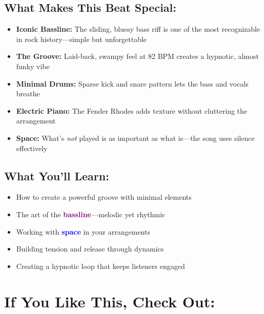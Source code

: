 \documentclass[11pt,letterpaper]{article}
\newcommand{\purple}[1]{\textcolor{purple}{\textbf{#1}}}
\newcommand{\bluepurple}[1]{\textcolor{blue}{\textbf{#1}}}
\begin{document}
\subsection*{What Makes This Beat Special:}

\begin{itemize}[leftmargin=*]
\item \textbf{Iconic Bassline:} The sliding, bluesy bass riff is one of the most recognizable in rock history—simple but unforgettable
\item \textbf{The Groove:} Laid-back, swampy feel at 82 BPM creates a hypnotic, almost funky vibe
\item \textbf{Minimal Drums:} Sparse kick and snare pattern lets the bass and vocals breathe
\item \textbf{Electric Piano:} The Fender Rhodes adds texture without cluttering the arrangement
\item \textbf{Space:} What's \textit{not} played is as important as what is—the song uses silence effectively
\end{itemize}

\subsection*{What You'll Learn:}

\begin{itemize}[leftmargin=*]
\item How to create a powerful groove with minimal elements
\item The art of the \purple{bassline}—melodic yet rhythmic
\item Working with \bluepurple{space} in your arrangements
\item Building tension and release through dynamics
\item Creating a hypnotic loop that keeps listeners engaged
\end{itemize}

\vspace{0.5cm}

\section*{If You Like This, Check Out:}
\end{document}
